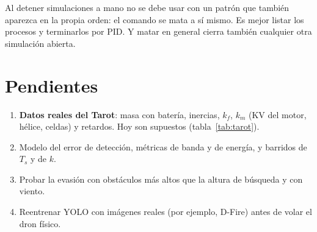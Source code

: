 \begin{aviso}
Al detener simulaciones a mano no se debe usar  con un patrón que también aparezca en
la propia orden: el comando se mata a sí mismo. Es mejor listar los procesos y terminarlos por PID.
Y matar  en general cierra también cualquier otra simulación abierta.
\end{aviso}

\section{Pendientes}

\begin{enumerate}
  \item \textbf{Datos reales del Tarot}: masa con batería, inercias, $k_f$, $k_m$ (KV del motor,
        hélice, celdas) y retardos. Hoy son supuestos (tabla~\ref{tab:tarot}).
  \item Modelo del error de detección, métricas de banda y de energía, y barridos de $T_s$ y
        de $k$.
  \item Probar la evasión con obstáculos más altos que la altura de búsqueda y con viento.
  \item Reentrenar YOLO con imágenes reales (por ejemplo, D-Fire) antes de volar el dron físico.
\end{enumerate}
